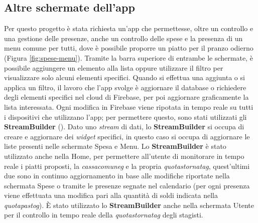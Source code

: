 \subsection{Altre schermate dell'app}
Per questo progetto è stata richiesta un'app che permettesse, oltre un controllo e una gestione delle presenze, anche un controllo delle spese e la presenza di un menu comune per tutti, dove è possibile proporre un piatto per il pranzo odierno (Figura \ref{fig:spese-menu}).\newline
Tramite la barra superiore di entrambe le schermate, è possibile aggiungere un elemento alla lista oppure utilizzare il filtro per visualizzare solo alcuni elementi specifici.\newline
\newline
Quando si effettua una aggiunta o si applica un filtro, il lavoro che l'app svolge è aggiornare il database o richiedere degli elementi specifici nel cloud di Firebase, per poi aggiornare graficamente la lista interessata.\newline
Ogni modifica in Firebase viene ripotata in tempo reale su tutti i dispositivi che utilizzano l'app; per permettere questo, sono stati utilizzati gli \textbf{StreamBuilder} (\cite{site:flutter-streambuilder}).\newline
Dato uno \emph{stream} di dati, lo \textbf{StreamBuilder} si occupa di creare e aggiornare dei \emph{widget} specifici, in questo caso si occupa di aggiornare le liste presenti nelle schermate Spesa e Menu.\newline
\newline
Lo \textbf{StreamBuilder} è stato utilizzato anche nella Home, per permettere all'utente di monitorare in tempo reale i piatti proposti, la \emph{\gls{cassacomuneg}} e la propria \emph{\gls{quotastornatag}}, quest'ultimi due sono in continuo aggiornamento in base alle modifiche riportate nella schermata Spese o tramite le presenze segnate nel calendario (per ogni presenza viene effettuata una modifica pari alla quantità di soldi indicata nella \emph{\gls{quotapastog}}).\newline
È stato utilizzato lo \textbf{StreamBuilder} anche nella schermata Utente per il controllo in tempo reale della \emph{\gls{quotastornatag}} degli stagisti.

\newpage

